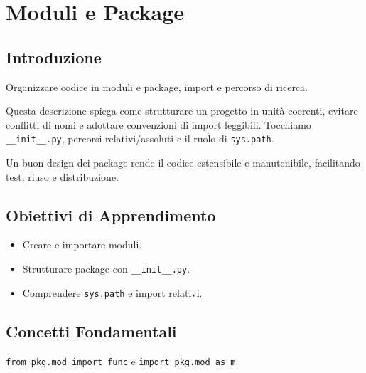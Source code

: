 \chapter{Moduli e Package}

\section{Introduzione}
Organizzare codice in moduli e package, import e percorso di ricerca.

Questa descrizione spiega come strutturare un progetto in unità coerenti, evitare conflitti di nomi e adottare convenzioni di import leggibili. Tocchiamo \texttt{\_\_init\_\_.py}, percorsi relativi/assoluti e il ruolo di \texttt{sys.path}.

Un buon design dei package rende il codice estensibile e manutenibile, facilitando test, riuso e distribuzione.

\section{Obiettivi di Apprendimento}
\begin{itemize}
  \item Creare e importare moduli.
  \item Strutturare package con \texttt{\_\_init\_\_.py}.
  \item Comprendere \texttt{sys.path} e import relativi.
\end{itemize}

\section{Concetti Fondamentali}
\begin{tcolorbox}[title=Import]
\texttt{from pkg.mod import func} e \texttt{import pkg.mod as m}
\end{tcolorbox}

